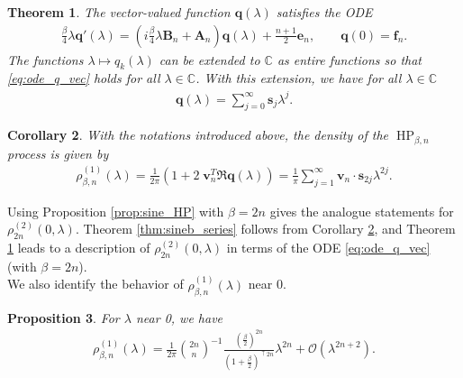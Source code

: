 \documentclass[12pt]{article}
\newtheorem{theorem}{Theorem}
\newtheorem{proposition}[theorem]{Proposition}
\newtheorem{corollary}[theorem]{Corollary}
\theoremstyle{definition} %
\newcommand{\CC}{{\mathbb C}}
\theoremstyle{remark} %
\begin{document}
\begin{theorem}\label{thm:even_beta}
 The vector-valued function $\mathbf{q}(\lambda)$ satisfies the ODE
 \begin{align}\label{eq:ode_q_vec}
     \frac{\beta}{4} \lambda \mathbf{q}'(\lambda) = (i \frac{\beta}{4}\lambda  \mathbf{B}_n   +\mathbf{A}_n) \mathbf{q}(\lambda)+\frac{n+1}{2} \mathbf{e}_n, \qquad \mathbf{q}(0)=\mathbf{f}_n.
\end{align}
The functions $\lambda\mapsto q_k(\lambda)$ can be extended to $\CC$ as entire functions  so that \eqref{eq:ode_q_vec} holds for all $\lambda\in \CC$. With this extension, we have for all $\lambda\in \CC$
\begin{align}\label{eq:q_expansion}
    \mathbf{q}(\lambda)=\sum_{j=0}^\infty \mathbf{s}_j \lambda^j.
\end{align} 
\end{theorem}


\begin{corollary}
\label{cor:int_case_rho}
   With the notations introduced above, the density  of the $\operatorname{HP}_{\beta, n}$ process is given by
\begin{align}\label{eq:int_case_rho}
    \rho^{(1)}_{\beta,n}(\lambda) =\frac{1}{2\pi}\left(1+2\;\mathbf{v}_n^T\Re \mathbf{q}(\lambda)\right)=\frac{1}{\pi} \sum_{j=1}^\infty \mathbf{v}_n\cdot \mathbf{s}_{2j} \lambda^{2j}.
\end{align}
\end{corollary}
Using Proposition \ref{prop:sine_HP} with $\beta=2n$ gives the analogue statements for $\rho_{2n}^{(2)}(0,\lambda)$. Theorem \ref{thm:sineb_series}  follows from Corollary \ref{cor:int_case_rho}, and Theorem \ref{thm:even_beta} leads to a description of $\rho_{2n}^{(2)}(0,\lambda)$ in terms of the ODE \eqref{eq:ode_q_vec} (with $\beta=2n$). \\
We also identify the behavior of $\rho_{\beta,n}^{(1)}(\lambda)$ near 0. 
\begin{proposition}
\label{prop:small_lambda_asym}
    For $\lambda$ near 0, we have 
       \begin{align}\label{eq:small_lambda_HP}
        \rho_{\beta,n}^{(1)}(\lambda) =\frac{1}{2\pi} 
      \binom{2n}{n}^{-1}\frac{\left(\tfrac{\beta}{2}\right)^{2n}}{\left(1+\frac{\beta}{2}\right)^{\uparrow 2n}}   \lambda^{2n}  
        + \mathcal{O}(\lambda^{2n+2}).
    \end{align} 
\end{proposition}
\end{document}
